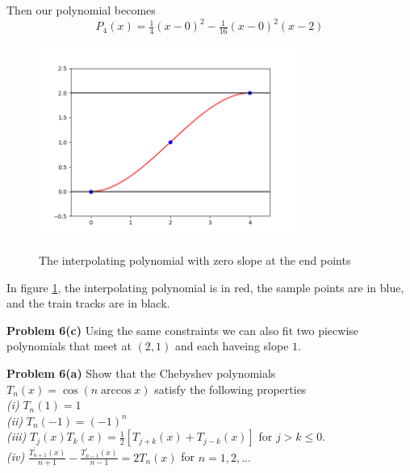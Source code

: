 \documentclass[12pt]{article}
\newcommand{\problem}[1]{\hspace{-4 ex} \large \textbf{Problem #1} }
\begin{document}
	Then our polynomial becomes
	$$
	P_4(x) = \tfrac{1}{4}(x-0)^2 - \tfrac{1}{16}(x-0)^2(x-2)
	$$

	\begin{figure}[H]
		\caption{The interpolating polynomial with zero slope at the end points}
		\includegraphics[width=0.75\textwidth]{hw4_figure_6}
		\centering
		\label{fig:p5b}
	\end{figure}
	In figure \ref{fig:p5b}, the interpolating polynomial is in red, the sample points are in blue, and the train tracks are in black. \bigbreak
	
\problem{6(c)} Using the same constraints we can also fit two piecwise polynomials that meet at $(2,1)$ and each haveing slope $1$.

	
	

\problem{6(a)} Show that the Chebyshev polynomials $T_n(x)=\cos{(n \arccos{x})}$ satisfy the following properties \\
\emph{(i)} $T_n(1) = 1$ \\
\emph{(ii)} $T_n(-1) = (-1)^n$ \\
\emph{(iii)} $T_j(x)T_k(x) = \tfrac{1}{2}[T_{j+k}(x) + T_{j-k}(x)]$ for $j>k\leq 0$. \\
\emph{(iv)} $\frac{T_{n+1}^\prime(x)}{n+1} - \frac{T_{n-1}^\prime(x)}{n-1} = 2T_n(x)$ for $n=1, 2, ...$ \\
\end{document}
